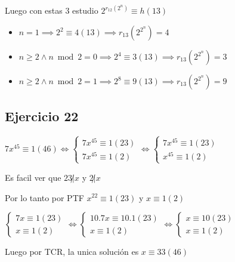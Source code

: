 Luego con estas 3 estudio $ 2^{r_{12}(2^n)} \equiv h(13) $

\begin{itemize}
    \item $ n = 1 \implies 2^2 \equiv 4(13) \implies r_{13}(2^{2^n}) = 4 $
    \item $ n \geq 2 \wedge n \bmod 2 = 0 \implies 2^4 \equiv 3(13) \implies r_{13}(2^{2^n}) = 3 $
    \item $ n \geq 2 \wedge n \bmod 2 = 1 \implies 2^8 \equiv 9(13) \implies r_{13}(2^{2^n}) = 9 $
\end{itemize}

\subsection{Ejercicio 22}

$ 7x^{45} \equiv 1(46) \iff \begin{cases}
    7x^{45} \equiv 1(23) \\
    7x^{45} \equiv 1(2)
\end{cases} 
\iff \begin{cases}
    7x^{45} \equiv 1(23) \\
    x^{45} \equiv 1(2)
\end{cases} $

Es facil ver que $ 23\not | x $ y $ 2\not | x $

Por lo tanto por PTF $ x^{22} \equiv 1(23) $ y $ x \equiv 1(2) $

$ \begin{cases}
    7x \equiv 1(23) \\
    x \equiv 1(2)
\end{cases} 
\iff \begin{cases}
    10.7x \equiv 10.1(23) \\
    x \equiv 1(2)
\end{cases}
\iff \begin{cases}
    x \equiv 10(23) \\
    x \equiv 1(2)
\end{cases} $

Luego por TCR, la unica solución es $ x \equiv 33(46) $



